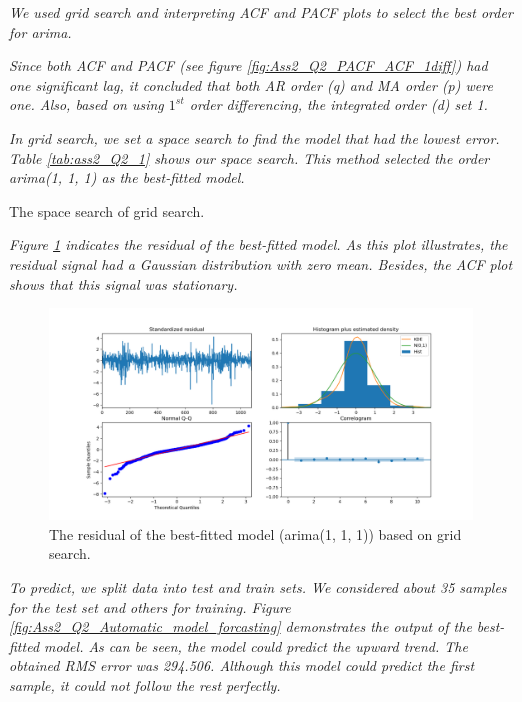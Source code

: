 \textit{We used grid search and interpreting \gls{ACF} and \gls{PACF} plots to select the best order for \gls{arima}.}

\textit{Since both \gls{ACF} and \gls{PACF} (see figure \ref{fig:Ass2_Q2_PACF_ACF_1diff}) had one significant lag, it concluded that both AR order (q) and MA order (p) were one. Also, based on using $1^{st}$ order differencing, the integrated order (d) set 1.}

\textit{In grid search, we set a space search to find the model that had the lowest error. Table \ref{tab:ass2_Q2_1} shows our space search. This method selected the order \gls{arima}(1, 1, 1) as the best-fitted model.}

\begin{table}[H]
\centering
\caption{The space search of grid search.}
\label{tab:ass2_Q2_1}

\end{table}

\textit{Figure \ref{fig:Ass2_Q2_best_model_residual} indicates the residual of the best-fitted model. As this plot illustrates, the residual signal had a Gaussian distribution with zero mean. Besides, the \gls{ACF} plot shows that this signal was stationary.}



\begin{figure}[H]
    \centering
    \begin{minipage}[b]{1\textwidth}
        \includegraphics[width=\textwidth]{manuscript/src/figures/Ass2/Ass2_Q2_best_model_residual.png}
    \end{minipage}
    \caption{The residual  of the best-fitted model (\gls{arima}(1, 1, 1)) based on grid search.}
    \label{fig:Ass2_Q2_best_model_residual}
\end{figure}

  
\textit{To predict, we split data into test and train sets. We considered about 35 samples for the test set and others for training. Figure \ref{fig:Ass2_Q2_Automatic_model_forcasting} demonstrates the output of the best-fitted model. As can be seen, the model could predict the upward trend. The obtained RMS error was 294.506. Although this model could predict the first sample, it could not follow the rest perfectly.}

